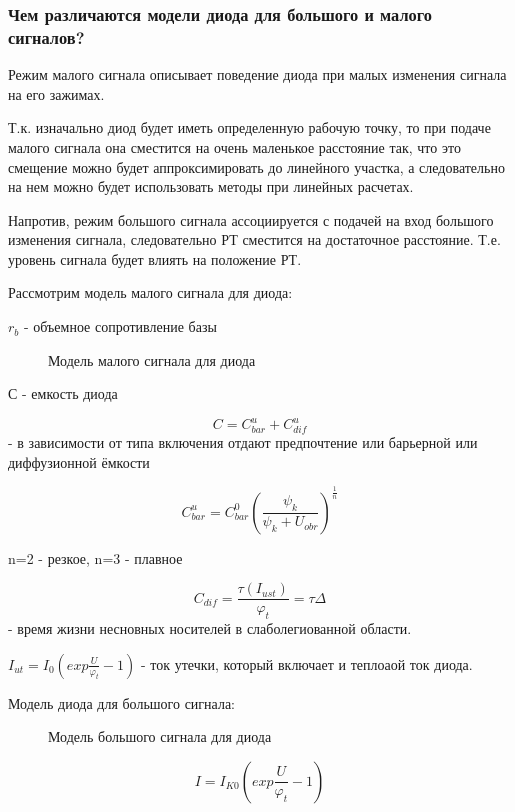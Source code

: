 
\subsubsection{Чем различаются модели диода для большого и малого сигналов?}

Режим малого сигнала описывает  поведение диода при малых изменения сигнала на его зажимах.
	
Т.к. изначально диод будет иметь определенную рабочую точку, то при подаче малого сигнала она сместится на очень маленькое расстояние так, что это смещение можно будет аппроксимировать до линейного участка, а следовательно на нем можно будет использовать методы при линейных расчетах.
	
Напротив, режим большого сигнала ассоциируется с подачей на вход большого изменения сигнала, следовательно РТ сместится на достаточное расстояние. Т.е. уровень сигнала будет влиять на положение РТ.
	
Рассмотрим модель малого сигнала для диода:
	
$r_b$ - объемное сопротивление базы
\begin{center}
	\begin{figure}[h!]
		\caption{Модель малого сигнала для диода}	
	\end{figure}
\end{center}

С - емкость диода

$$
	C=C^u_{bar}+C^u_{dif}
$$ - в зависимости от типа включения отдают предпочтение или барьерной или диффузионной ёмкости



$$
C^u_{bar}=C^0_{bar}\left(\frac{\psi_k}{\psi_k + U_{obr}}\right)^\frac1n
$$

n=2 - резкое, n=3 - плавное

$$
C_{dif}=\frac{\tau(I_{ust})}{\varphi_t}=\tau\Delta
$$ - время жизни несновных носителей в слаболегиованной области.

$I_{ut} = I_0(exp\frac{U}{\varphi_t}-1)$ - ток утечки, который включает и теплоаой ток диода.

Модель диода для большого сигнала:
\begin{center}
\begin{figure}[h!]
		\caption{Модель большого сигнала для диода}
	\end{figure}
\end{center}	
$$
I=I_{K0}(exp\frac{U}{\varphi_t}-1)
$$

